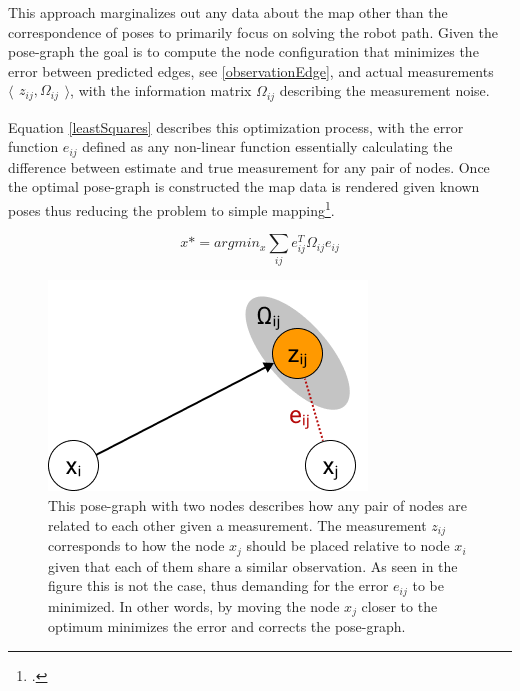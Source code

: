This approach marginalizes out any data about the map other than the correspondence of poses to primarily focus on solving the robot path.  
Given the pose-graph the goal is to compute the node configuration that minimizes the error between predicted edges, see \ref{observationEdge}, and actual measurements 
$
\langle
\begin{matrix}
	z_{ij},  \Omega_{ij}
\end{matrix}
\rangle
$, with the information matrix $\Omega_{ij}$ describing the measurement noise.

Equation \ref{leastSquares} describes this optimization process, with the error function $e_{ij}$ defined as any non-linear function essentially calculating the difference between estimate and true measurement for any pair of nodes. 
Once the optimal pose-graph is constructed the map data is rendered given known poses thus reducing the problem to simple mapping\footcite{grisetti2010graphSLAM}.

\begin{equation}\label{leastSquares}
	x* = argmin_{x} \sum_{ij}e_{ij}^{T} \Omega_{ij} e_{ij}
\end{equation}


\begin{figure}
	\centering
	\includegraphics[width=0.4\linewidth]{img/PoseGraphOptimization}
	\caption{
		This pose-graph with two nodes describes how any pair of nodes are related to each other given a measurement. The measurement $ z_{ij} $ corresponds to how the node $x_{j}$ should be placed relative to node $x_{i}$ given that each of them share a similar observation. As seen in the figure this is not the case, thus demanding for the error $e_{ij}$ to be minimized. In other words, by moving the node $x_{j}$ closer to the optimum minimizes the error and corrects the pose-graph. 
	}
	\label{fig:poseGraphOptimization}
\end{figure}


